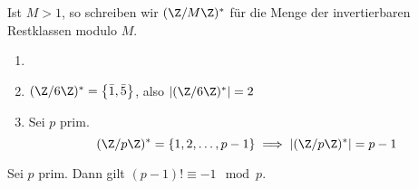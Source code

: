 \begin{notat*}
	Ist $M > 1$, so schreiben wir \( (\Z / M\Z)^* \) für die Menge der invertierbaren Restklassen modulo $M$.
\end{notat*}

\begin{exmp*}
	\begin{enumerate}
		\item[]
		\item \( (\Z/6\Z)^* = \left\{\bar{1},\bar{5}\right\} \), also \( |(\Z/6\Z)^*| = 2 \)
		\item Sei $p$ prim.
		\[ (\Z/p\Z)^* = \{1, 2, \dotsc, p-1 \} \implies |(\Z/p\Z)^*| = p-1 \]
	\end{enumerate}
\end{exmp*}

\begin{lem}\autolabel
	Sei $p$ prim. Dann gilt \( (p-1)! \equiv -1 \mod p. \)
\end{lem}
